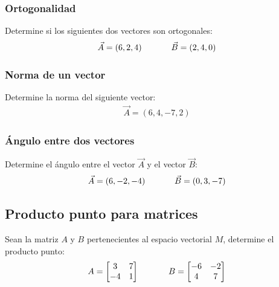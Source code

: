 \documentclass{article}
\begin{document}
        \subsubsection{Ortogonalidad}

            Determine si los siguientes dos vectores son ortogonales:
            \begin{gather*}
                \vec{A} = (6,2,4) \hspace*{35 pt} \vec{B}=(2,4,0)
            \end{gather*}

        \subsubsection{Norma de un vector}

            Determine la norma del siguiente vector:
            \begin{gather*}
                \vec{A} = (6,4,-7,2)
            \end{gather*}

        \subsubsection{Ángulo entre dos vectores}

            Determine el ángulo entre el vector $\vec{A}$ y el vector $\vec{B}$:
            \begin{gather*}
                \vec{A} = (6,-2,-4) \hspace*{35 pt} \vec{B} = (0, 3, -7)
            \end{gather*}

    \subsection{Producto punto para matrices}

            Sean la matriz $A$ y $B$ pertenecientes al espacio vectorial $M$, determine el producto punto:
            \begin{gather*}
                A = \begin{bmatrix}
                    3  & 7 \\
                    -4 & 1
                \end{bmatrix} \hspace*{35 pt}
                B = \begin{bmatrix}
                    -6 & -2 \\
                    4  & 7
                \end{bmatrix}
            \end{gather*}
    
\end{document}
